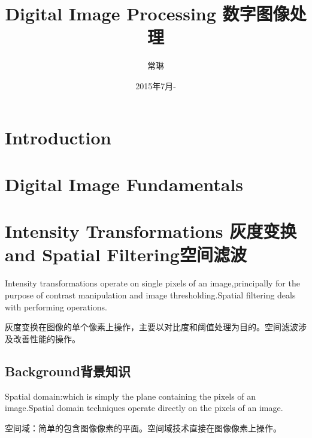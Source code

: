 \documentclass[12pt]{article}
\numberwithin{equation}{section}%
\begin{document}
\title{\vspace{-2em}Digital Image Processing 数字图像处理\vspace{-0.7em}}
\author{常琳}
\date{\vspace{-0.7em}2015年7月-\vspace{-0.7em}}
\maketitle\thispagestyle{fancy}
\maketitle
\tableofcontents 
\section{Introduction}
\section{Digital Image Fundamentals}
\section{Intensity Transformations 灰度变换 and Spatial Filtering空间滤波}

Intensity transformations operate on single pixels of an
image,principally for the purpose of contrast manipulation and image thresholding.Spatial filtering deals with performing operations.

灰度变换在图像的单个像素上操作，主要以对比度和阈值处理为目的。空间滤波涉及改善性能的操作。
\subsection{Background背景知识}

Spatial domain:which is simply the plane containing the pixels of an image.Spatial domain techniques operate directly on the pixels of an image. 

空间域：简单的包含图像像素的平面。空间域技术直接在图像像素上操作。
\end{document}
